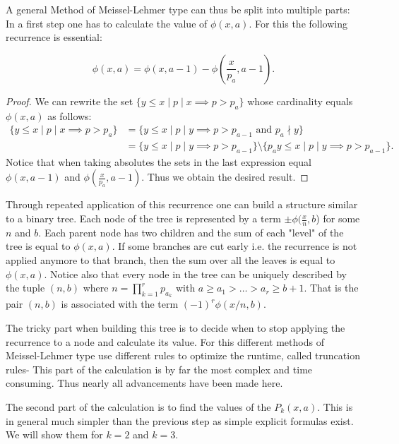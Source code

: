 A general Method of Meissel-Lehmer type can thus be split into multiple parts:
In a first step one has to calculate the value of $\phi(x,a)$. For this the following recurrence is essential:
\begin{lemma}
	 \[
		 \phi(x,a) = \phi(x,a-1) - \phi(\frac{x}{p_{a}}, a-1)
	.\] 
\end{lemma}

\begin{proof}
	We can rewrite the set $\{y \leq x \mid p \mid x \implies p > p_{a}\}$ whose cardinality equals $\phi(x,a)$ as follows:
	\begin{align*}
		\{y \leq x \mid p \mid x \implies p > p_{a}\} &= \{y \leq x \mid p \mid y \implies p > p_{a-1} \text{ and } p_{a} \nmid y\}\\
		&=  \{y \leq x \mid p \mid y \implies p > p_{a-1}\} \setminus \{p_{a}y \leq x \mid p \mid y \implies p > p_{a-1}\}
	.\end{align*}
	Notice that when taking absolutes the sets in the last expression equal $\phi(x,a-1)$ and $\phi(\frac{x}{p_{a}},a-1)$.
	Thus we obtain the desired result.
\end{proof}

Through repeated application of this recurrence one can  build a structure similar to a binary tree.
Each node of the tree is represented by a term $\pm \phi(\frac{x}{n},b$) for some $n$ and $b$. 
Each parent node has two children and the sum of each "level" of the tree
is equal to $\phi(x,a)$. If some branches are cut early i.e. the recurrence is not applied anymore to that branch, then the sum over all the leaves is equal to $\phi(x,a)$.
Notice also that every node in the tree can be uniquely described by the tuple $(n,b)$ where $n = \prod_{k=1}^{r} p_{a_{k}}$ with 
$a \geq a_1 > \ldots > a_{r} \geq b +1$. That is the pair $(n,b)$ is associated with the term $(-1)^{r} \phi(x / n , b)$.

The tricky part when building this tree is to decide when to stop applying the recurrence to a node and calculate its value.
For this different methods of Meissel-Lehmer type use different rules to optimize the runtime, called truncation rules-
This part of the calculation is by far the most complex and time consuming. Thus nearly all advancements have been made here.

The second part of the calculation is to find the values of the $P_{k}(x,a)$.
This is in general much simpler than the previous step as simple explicit formulas exist.
We will show them for $k=2$ and $k=3$.

